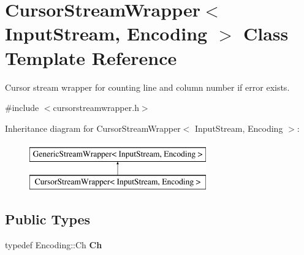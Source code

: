 \hypertarget{classCursorStreamWrapper}{}\section{Cursor\+Stream\+Wrapper$<$ Input\+Stream, Encoding $>$ Class Template Reference}
\label{classCursorStreamWrapper}


Cursor stream wrapper for counting line and column number if error exists.  




{\ttfamily \#include $<$cursorstreamwrapper.\+h$>$}

Inheritance diagram for Cursor\+Stream\+Wrapper$<$ Input\+Stream, Encoding $>$\+:\begin{figure}[H]
\begin{center}
\leavevmode
\includegraphics[height=2.000000cm]{classCursorStreamWrapper}
\end{center}
\end{figure}
\subsection*{Public Types}
\begin{DoxyCompactItemize}
\item 
typedef Encoding\+::\+Ch {\bfseries Ch}\hypertarget{classCursorStreamWrapper_a4bab1186bfeebbcf00719c2613b0dca6}{}\label{classCursorStreamWrapper_a4bab1186bfeebbcf00719c2613b0dca6}

\end{DoxyCompactItemize}
